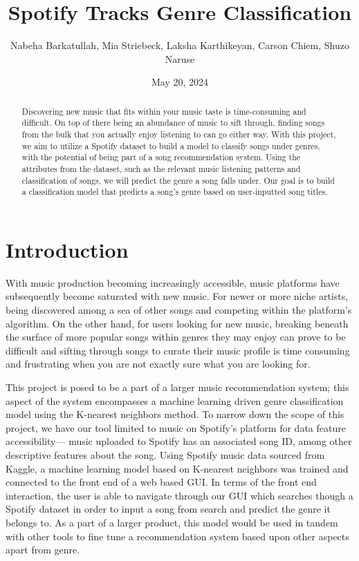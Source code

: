 \documentclass[times, twocolumn]{article}
\title{Spotify Tracks Genre Classification}
\author{Nabeha Barkatullah, Mia Striebeck, Laksha Karthikeyan, Carson Chiem, Shuzo Naruse}
\date{May 20, 2024}
\begin{document}
\maketitle

\newpage
\begin{abstract}
Discovering new music that fits within your music taste is time-consuming and difficult. On top of there being an abundance of music to sift through, finding songs from the bulk that you actually enjoy listening to can go either way. With this project, we aim to utilize a Spotify dataset to build a model to classify songs under genres, with the potential of being part of a song recommendation system. Using the attributes from the dataset, such as the relevant music listening patterns and classification of songs, we will predict the genre a song falls under. Our goal is to build a classification model that predicts a song’s genre based on user-inputted song titles.
\end{abstract}
\section{Introduction}
With music production becoming increasingly accessible, music platforms have subsequently become saturated with new music. For newer or more niche artists, being discovered among a sea of other songs and competing within the platform’s algorithm. On the other hand, for users looking for new music, breaking beneath the surface of more popular songs within genres they may enjoy can prove to be difficult and sifting through songs to curate their music profile is time consuming and frustrating when you are not exactly sure what you are looking for. 

This project is posed to be a part of a larger music recommendation system; this aspect of the system encompasses a machine learning driven genre classification model using the K-nearest neighbors method. To narrow down the scope of this project, we have our tool limited to music on Spotify’s platform for data feature accessibility— music uploaded to Spotify has an associated song ID, among other descriptive features about the song. Using Spotify music data sourced from Kaggle, a machine learning model based on K-nearest neighbors was trained and connected to the front end of a web based GUI.  In terms of the front end interaction, the user is able to navigate through our GUI which searches though a Spotify dataset in order to input a song from search and predict the genre it belongs to. As a part of a larger product, this model would be used in tandem with other tools to fine tune a recommendation system based upon other aspects apart from genre. 
\end{document}

